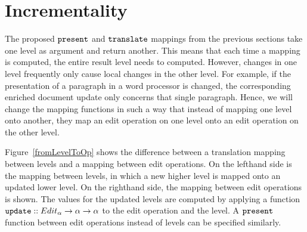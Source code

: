 





%																
\section{Incrementality}

The proposed ${\tt present}$ and ${\tt translate}$ mappings from the previous sections take one level as argument and return another. This means that each time a mapping is computed, the entire result level needs to computed. However, changes in one level frequently only cause local changes in the other level. For example, if the presentation of a paragraph in a word processor is changed, the corresponding enriched document update only concerns that single paragraph. Hence, we will change the mapping functions in such a way that instead of mapping one level onto another, they map an edit operation on one level onto an edit operation on the other level. 

Figure~\ref{fromLevelToOp} shows the difference between a translation mapping between levels and a mapping between edit operations. On the lefthand side is the mapping between levels, in which a new higher level is mapped onto an updated lower level. On the righthand side, the mapping between edit operations is shown. The values for the updated levels are computed by applying a function
 ${\tt update} :: Edit_\alpha \rightarrow \alpha \rightarrow \alpha$ to the edit operation and the level. A 
 ${\tt present}$ function between edit operations instead of levels can be specified similarly.

